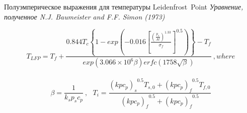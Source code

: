 \begin{frame}{Полуэмперическое выражения для температуры Leidenfrost\ Point}
\textcolor[RGB]{0,128,255}{\sl Уравнение, полученное N.J. Baumeister and F.F. Simon (1973)}
\begin{doublespace}
\centering\[T_{LFP}=T_{f}+\frac{0.844T_{c}\left\{1-exp\left(-0.016\left[\frac{\left({\frac{p_{s}}{At}}\right)^{1.33}}{\sigma_{f}}\right]^{0.5}\right)\right\}-T_{f}}{exp\left(3.066\times10^6\beta\right)erfc\left(1758\sqrt{\beta}\right)} \ ,where\] 
\ \[\beta=\frac{1}{k_{s}p_{s}c_{p}}\  ,   \ \  \ T_{i}=\frac{{\left(kpc_{p}\right)_{s}}^{0.5}T_{s,0}+{\left(kpc_{p}\right)_{f}}^{0.5}T_{f,0}}{{\left(kpc_{p}\right)_{f}}^{0.5}+{\left(kpc_{p}\right)_{f}}^{0.5}}\] 
\end{doublespace}
\end{frame}